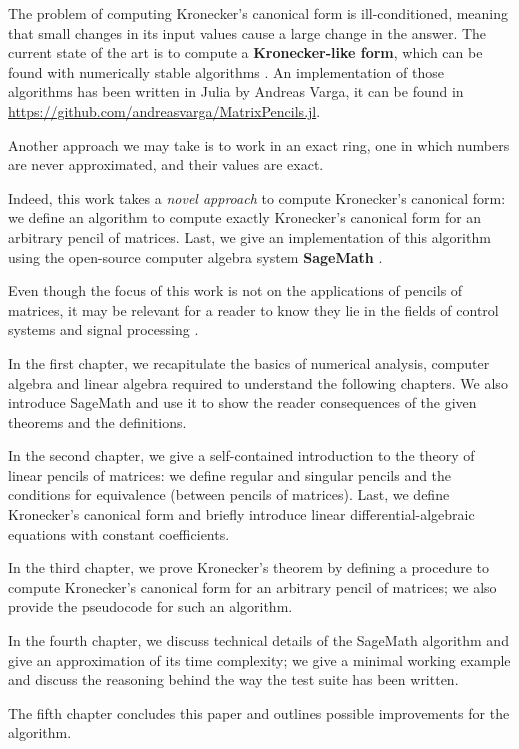 The problem of computing Kronecker's canonical form is ill-conditioned, meaning that small changes in its input values cause
a large change in the answer. The current state of the art is to compute a \textbf{Kronecker-like form}, which can be found with
numerically stable algorithms \cite{beelen-van_dooren}. An implementation of those algorithms has been written
in Julia \cite{bezanson2017julia} by Andreas Varga, it can be found in \url{https://github.com/andreasvarga/MatrixPencils.jl}.

Another approach we may take is to work in an exact ring, one in which numbers are never
approximated, and their values are exact.

Indeed, this work takes a \textit{novel approach} to compute Kronecker's canonical form: we define an algorithm to
compute exactly
Kronecker's canonical form for an arbitrary pencil of matrices. Last, we give an implementation of this
algorithm \cite{Trapani_Computation_of_Kronecker_s} using the open-source computer algebra
system \textbf{SageMath} \cite{sage}.

Even though the focus of this work is not on the applications of pencils of matrices, it may be relevant for a reader to
know they lie in the fields of control systems \cite{824690, 1103983} and signal
processing \cite{1179782}.

\vspace{5mm}

In the first chapter, we recapitulate the basics of numerical analysis, computer algebra and linear algebra required to
understand the following chapters. We also introduce SageMath and use it to show the reader consequences of the given
theorems and the definitions.

In the second chapter, we give a self-contained introduction to the theory of linear pencils of matrices: we define regular
and singular pencils and the conditions for equivalence (between pencils of matrices). Last, we define Kronecker's canonical
form and briefly introduce linear differential-algebraic equations with constant coefficients.

In the third chapter, we prove Kronecker's theorem by defining a procedure to compute Kronecker's canonical form
for an arbitrary pencil of matrices; we also provide the pseudocode for such an algorithm.

In the fourth chapter, we discuss technical details of the SageMath algorithm and
give an approximation of its time complexity; we give a minimal working example and discuss the reasoning behind the way
the test suite has been written.

The fifth chapter concludes this paper and outlines possible improvements for the algorithm.